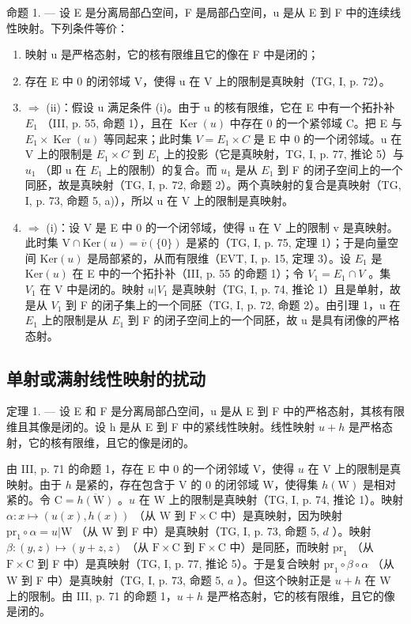 命题 1. --- 设 E 是分离局部凸空间，F 是局部凸空间，u 是从 E 到 F 中的连续线性映射。下列条件等价：

\begin{enumerate}
\def\labelenumi{(\roman{enumi})}
\item
  映射 u 是严格态射，它的核有限维且它的像在 F 中是闭的；
\item
  存在 E 中 0 的闭邻域 V，使得 u 在 V 上的限制是真映射（TG, I, p. 72）。
\item
  \(\Longrightarrow\) (ii)：假设 u 满足条件 (i)。由于 u 的核有限维，它在 E 中有一个拓扑补 \(E_{1}\) （III, p. 55, 命题 1），且在 \(\operatorname{Ker}(u)\) 中存在 0 的一个紧邻域 C。把 E 与 \(E_{1} \times \operatorname{Ker}(u)\) 等同起来；此时集 \(V = E_{1} \times C\) 是 E 中 0 的一个闭邻域。u 在 V 上的限制是 \(E_{1} \times C\) 到 \(E_{1}\) 上的投影（它是真映射，TG, I, p. 77, 推论 5）与 \(u_{1}\) （即 u 在 \(E_{1}\) 上的限制）的复合。而 \(u_{1}\) 是从 \(E_{1}\) 到 F 的闭子空间上的一个同胚，故是真映射（TG, I, p. 72, 命题 2）。两个真映射的复合是真映射（TG, I, p. 73, 命题 5, a)），所以 u 在 V 上的限制是真映射。
\item
  \(\Longrightarrow\) (i)：设 V 是 E 中 0 的一个闭邻域，使得 u 在 V 上的限制 v 是真映射。此时集 \(\mathrm{V} \cap \mathrm{Ker}(u) = \overline{v}(\{0\})\) 是紧的（TG, I, p. 75, 定理 1）；于是向量空间 \(\mathrm{Ker}(u)\) 是局部紧的，从而有限维（EVT, I, p. 15, 定理 3）。设 \(E_{1}\) 是 \(\mathrm{Ker}(u)\) 在 E 中的一个拓扑补（III, p. 55 的命题 1）；令 \(V_{1} = E_{1} \cap V\) 。集 \(V_{1}\) 在 V 中是闭的。映射 \(u|V_{1}\) 是真映射（TG, I, p. 74, 推论 1）且是单射，故是从 \(V_{1}\) 到 F 的闭子集上的一个同胚（TG, I, p. 72, 命题 2）。由引理 1，u 在 \(E_{1}\) 上的限制是从 \(E_{1}\) 到 F 的闭子空间上的一个同胚，故 u 是具有闭像的严格态射。
\end{enumerate}

\subsection{单射或满射线性映射的扰动}

定理 1. --- 设 E 和 F 是分离局部凸空间，u 是从 E 到 F 中的严格态射，其核有限维且其像是闭的。设 h 是从 E 到 F 中的紧线性映射。线性映射 \(u + h\) 是严格态射，它的核有限维，且它的像是闭的。

由 III, p. 71 的命题 1，存在 E 中 0 的一个闭邻域 V，使得 \(u\) 在 V 上的限制是真映射。由于 \(h\) 是紧的，存在包含于 V 的 0 的闭邻域 W，使得集 \(h(\mathrm{W})\) 是相对紧的。令 \(\mathrm{C} = \overline{h(\mathrm{W})}\) 。\(u\) 在 W 上的限制是真映射（TG, I, p. 74, 推论 1）。映射 \(\alpha: x \mapsto (u(x), h(x))\) （从 W 到 \(\mathrm{F} \times \mathrm{C}\) 中）是真映射，因为映射 \(\mathrm{pr}_1 \circ \alpha = u|\mathrm{W}\) （从 W 到 F 中）是真映射（TG, I, p. 73, 命题 5, \(d\) ）。映射 \(\beta: (y, z) \mapsto (y + z, z)\) （从 \(\mathrm{F} \times \mathrm{C}\) 到 \(\mathrm{F} \times \mathrm{C}\) 中）是同胚，而映射 \(\mathrm{pr}_1\) （从 \(\mathrm{F} \times \mathrm{C}\) 到 F 中）是真映射（TG, I, p. 77, 推论 5）。于是复合映射 \(\mathrm{pr}_1 \circ \beta \circ \alpha\) （从 W 到 F 中）是真映射（TG, I, p. 73, 命题 5, \(a\) ）。但这个映射正是 \(u + h\) 在 W 上的限制。由 III, p. 71 的命题 1，\(u + h\) 是严格态射，它的核有限维，且它的像是闭的。

